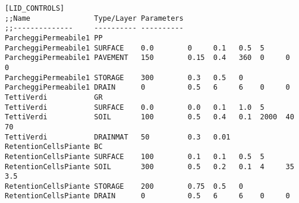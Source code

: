 \begin{lstlisting}
[LID_CONTROLS]
;;Name               Type/Layer Parameters
;;--------------     ---------- ----------
ParcheggiPermeabile1 PP
ParcheggiPermeabile1 SURFACE    0.0        0     0.1   0.5  5
ParcheggiPermeabile1 PAVEMENT   150        0.15  0.4   360  0     0    0
ParcheggiPermeabile1 STORAGE    300        0.3   0.5   0
ParcheggiPermeabile1 DRAIN      0          0.5   6     6    0     0
TettiVerdi           GR
TettiVerdi           SURFACE    0.0        0.0   0.1   1.0  5
TettiVerdi           SOIL       100        0.5   0.4   0.1  2000  40   70
TettiVerdi           DRAINMAT   50         0.3   0.01
RetentionCellsPiante BC
RetentionCellsPiante SURFACE    100        0.1   0.1   0.5  5
RetentionCellsPiante SOIL       300        0.5   0.2   0.1  4     35   3.5
RetentionCellsPiante STORAGE    200        0.75  0.5   0
RetentionCellsPiante DRAIN      0          0.5   6     6    0     0
\end{lstlisting}
